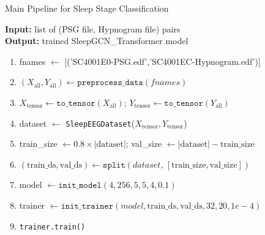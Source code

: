 \begin{algorithm}[H]
	\caption{Main Pipeline for Sleep Stage Classification}
	\label{alg:main}
	\textbf{Input:} list of (PSG file, Hypnogram file) pairs\\
	\textbf{Output:} trained SleepGCN\_Transformer model
	\begin{enumerate}
		\item fnames $\leftarrow$ [('SC4001E0-PSG.edf','SC4001EC-Hypnogram.edf')]\label{step:fnames}
		\item $(X_{\mathrm{all}},Y_{\mathrm{all}}) \leftarrow \texttt{preprocess\_data}(fnames)$
		\item $X_{\mathrm{tensor}} \leftarrow \texttt{to\_tensor}(X_{\mathrm{all}})$; \quad
		$Y_{\mathrm{tensor}} \leftarrow \texttt{to\_tensor}(Y_{\mathrm{all}})$
		\item dataset $\leftarrow$ \texttt{SleepEEGDataset}($X_{\mathrm{tensor}},Y_{\mathrm{tensor}}$)
		\item train\_size $\leftarrow 0.8\times |\text{dataset}|$; \quad
		val\_size $\leftarrow |\text{dataset}| - \text{train\_size}$
		\item $(\text{train\_ds},\text{val\_ds}) \leftarrow \texttt{split}(dataset,\,[\text{train\_size},\text{val\_size}])$
		\item model $\leftarrow \texttt{init\_model}(4,256,5,5,4,0.1)$
		\item trainer $\leftarrow \texttt{init\_trainer}(model,\text{train\_ds},\text{val\_ds},32,20,1e-4)$
		\item \texttt{trainer.train()}
	\end{enumerate}
\end{algorithm}

